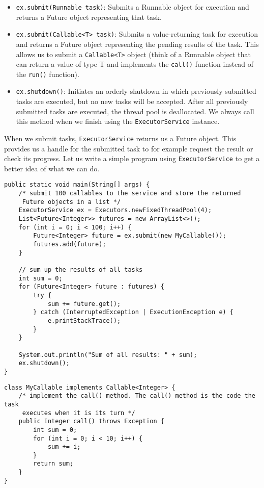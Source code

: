 \documentclass[main.tex]{subfiles}
\begin{document}
\begin{itemize}
  \item \texttt{ex.submit(Runnable task)}: Submits a Runnable object for execution and returns a Future object representing that task.
  \item \texttt{ex.submit(Callable<T> task)}: Submits a value-returning task for execution and returns a Future object representing the pending results of the task. This allows us to submit a \texttt{Callable<T>} object (think of a Runnable object that can return a value of type T and implements the \texttt{call()} function instead of the \texttt{run()} function).
  \item \texttt{ex.shutdown()}: Initiates an orderly shutdown in which previously submitted tasks are executed, but no new tasks will be accepted. After all previously submitted tasks are executed, the thread pool is deallocated. We always call this method when we finish using the \texttt{ExecutorService} instance.
\end{itemize}
\noindent When we submit tasks, \texttt{ExecutorService} returns us a Future object. This provides us a handle for the submitted task to for example request the result or check its progress. Let us write a simple program using \texttt{ExecutorService} to get a better idea of what we can do.

\begin{verbatim}
public static void main(String[] args) {
    /* submit 100 callables to the service and store the returned
     Future objects in a list */
    ExecutorService ex = Executors.newFixedThreadPool(4);
    List<Future<Integer>> futures = new ArrayList<>();
    for (int i = 0; i < 100; i++) {
        Future<Integer> future = ex.submit(new MyCallable());
        futures.add(future);
    }

    // sum up the results of all tasks
    int sum = 0;
    for (Future<Integer> future : futures) {
        try {
            sum += future.get();
        } catch (InterruptedException | ExecutionException e) {
            e.printStackTrace();
        }
    }

    System.out.println("Sum of all results: " + sum);
    ex.shutdown();
}
\end{verbatim}

\newpage

\begin{verbatim}
class MyCallable implements Callable<Integer> {
    /* implement the call() method. The call() method is the code the task
     executes when it is its turn */
    public Integer call() throws Exception {
        int sum = 0;
        for (int i = 0; i < 10; i++) {
            sum += i;
        }
        return sum;
    }
}
\end{verbatim}
\end{document}
